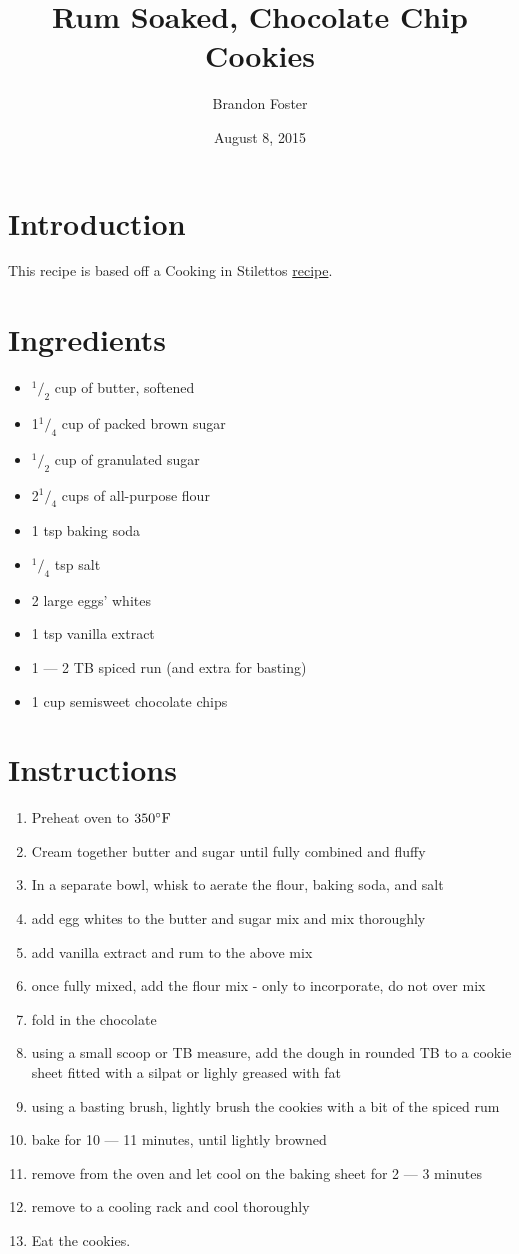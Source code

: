 \documentclass[twocolumn]{article}
\title{Rum Soaked, Chocolate Chip Cookies}
\author{Brandon Foster}
\date{August 8, 2015}
\begin{document}
\maketitle
\section{Introduction}
This recipe is based off a Cooking in Stilettos \href{http://cookinginstilettos.com/rum-soaked-chocolate-chip-cookies/}{recipe}.

\section{Ingredients}
\begin{itemize}
\item $^1/_2$ cup of butter, softened
\item 1$^1/_4$ cup of packed brown sugar
\item $^1/_2$ cup of granulated sugar
\item 2$^1/_4$ cups of all-purpose flour
\item 1 tsp baking soda
\item $^1/_4$ tsp salt
\item 2 large eggs' whites
\item 1 tsp vanilla extract
\item 1 --- 2 TB spiced run (and extra for basting)
\item 1 cup semisweet chocolate chips
\end{itemize}

\section{Instructions}
\begin{enumerate}
\item Preheat oven to $350^{\circ}{\rm F}$
\item Cream together butter and sugar until fully combined and fluffy
\item In a separate bowl, whisk to aerate the flour, baking soda, and salt
\item add egg whites to the butter and sugar mix and mix thoroughly
\item add vanilla extract and rum to the above mix
\item once fully mixed, add the flour mix - only to incorporate, do not over mix
\item fold in the chocolate
\item using a small scoop or TB measure, add the dough in rounded TB to a cookie sheet fitted with a silpat or lighly greased with fat
\item using a basting brush, lightly brush the cookies with a bit of the spiced rum
\item bake for 10 --- 11 minutes, until lightly browned
\item remove from the oven and let cool on the baking sheet for 2 --- 3 minutes
\item remove to a cooling rack and cool thoroughly
\item Eat the cookies.
\end{enumerate}
\end{document}
